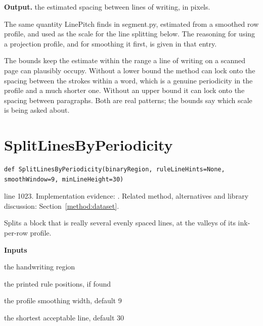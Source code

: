 \noindent\textbf{Output.} the estimated spacing between lines of writing, in pixels.


The same quantity LinePitch finds in segment.py, estimated from a smoothed row profile, and used as the scale for the line splitting below. The reasoning for using a projection profile, and for smoothing it first, is given in that entry.


The bounds keep the estimate within the range a line of writing on a scanned page can plausibly occupy. Without a lower bound the method can lock onto the spacing between the strokes within a word, which is a genuine periodicity in the profile and a much shorter one. Without an upper bound it can lock onto the spacing between paragraphs. Both are real patterns; the bounds say which scale is being asked about.



\section{SplitLinesByPeriodicity}\label{fn:train:SplitLinesByPeriodicity}
\begin{lstlisting}[style=sig]
def SplitLinesByPeriodicity(binaryRegion, ruleLineHints=None, smoothWindow=9, minLineHeight=30)
\end{lstlisting}
 line 1023. Implementation evidence: \cite{code2026}. Related method, alternatives and library discussion: Section~\ref{method:dataset}.


Splits a block that is really several evenly spaced lines, at the valleys of its ink-per-row profile.




\noindent\textbf{Inputs}
\begin{description}[leftmargin=2.2em,style=nextline,font=\normalfont\ttfamily]\setlength\itemsep{1pt}
  \item[{binaryRegion}] \normalfont the handwriting region
  \item[{ruleLineHints}] \normalfont the printed rule positions, if found
  \item[{smoothWindow}] \normalfont the profile smoothing width, default 9
  \item[{minLineHeight}] \normalfont the shortest acceptable line, default 30
\end{description}

